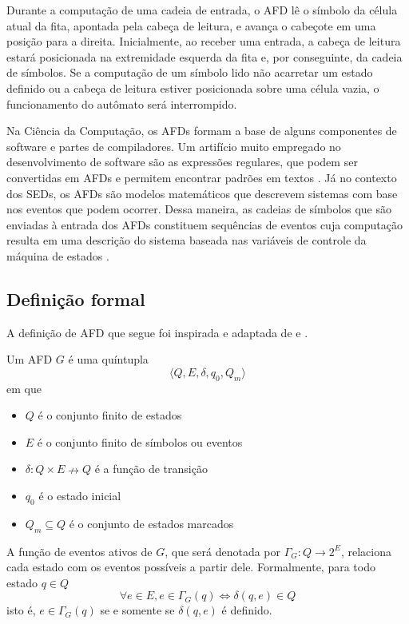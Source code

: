 Durante a computação de uma cadeia de entrada, o AFD lê o símbolo da célula atual da fita, apontada pela cabeça de leitura, e avança o cabeçote em uma posição para a direita. Inicialmente, ao receber uma entrada, a cabeça de leitura estará posicionada na extremidade esquerda da fita e, por conseguinte, da cadeia de símbolos. Se a computação de um símbolo lido não acarretar um estado definido ou a cabeça de leitura estiver posicionada sobre uma célula vazia, o funcionamento do autômato será interrompido.

Na Ciência da Computação, os AFDs formam a base de alguns componentes de software e partes de compiladores. Um artifício muito empregado no desenvolvimento de software são as expressões regulares, que podem ser convertidas em AFDs e permitem encontrar padrões em textos \cite{hopcroft}. Já no contexto dos \acs{SED}s, os AFDs são modelos matemáticos que descrevem sistemas com base nos eventos que podem ocorrer. Dessa maneira, as cadeias de símbolos que são enviadas à entrada dos AFDs constituem sequências de eventos cuja computação resulta em uma descrição do sistema baseada nas variáveis de controle da máquina de estados \cite{cassandras}.

\subsection{Definição formal}

A definição de \acs{AFD} que segue foi inspirada e adaptada de  e .

Um AFD $G$ é uma quíntupla \begin{equation}
\label{eq:afd}
\langle Q, E, \delta, q_0, Q_m \rangle
\end{equation} em que \begin{itemize}[label={}]
  \item $Q$ é o conjunto finito de estados
  \item $E$ é o conjunto finito de símbolos ou eventos
  \item $\delta:Q \times E \nrightarrow Q$ é a função de transição
  \item $q_0 $ é o estado inicial
  \item $Q_m \subseteq Q$ é o conjunto de estados marcados
\end{itemize}

A função de eventos ativos de $G$, que será denotada por $\Gamma_G:Q \to 2^E$, relaciona cada estado com os eventos possíveis a partir dele. Formalmente, para todo estado $q \in Q$ $$\forall e \in E, e \in \Gamma_G(q) \Leftrightarrow \delta(q, e) \in Q$$ isto é, $e \in \Gamma_G(q)$ se e somente se $\delta(q, e)$ é definido.

